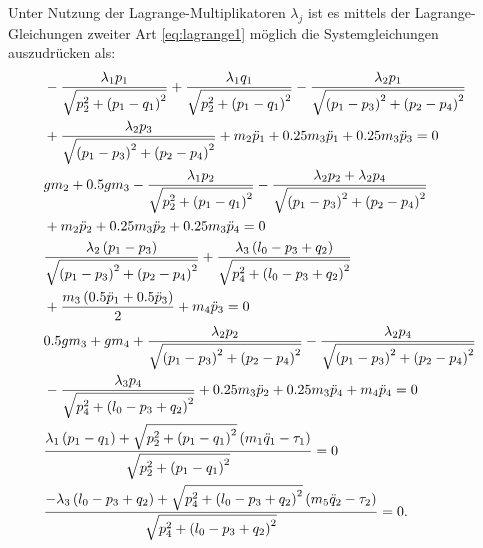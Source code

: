 Unter Nutzung der Lagrange-Multiplikatoren $\lambda_j$ ist es mittels der Lagrange-Gleichungen zweiter Art \eqref{eq:lagrange1} möglich die Systemgleichungen auszudrücken als:
\begin{subequations}
	\begin{flalign}
		&- \frac{\lambda_{1} p_{1}}{\sqrt{p_{2}^{2} + \left(p_{1} - q_{1}\right)^{2}}} + \frac{\lambda_{1} q_{1}}{\sqrt{p_{2}^{2} + \left(p_{1} - q_{1}\right)^{2}}} - \frac{\lambda_{2} p_{1}}{\sqrt{\left(p_{1} - p_{3}\right)^{2} + \left(p_{2} - p_{4}\right)^{2}}} \nonumber \\
		&+ \frac{\lambda_{2} p_{3}}{\sqrt{\left(p_{1} - p_{3}\right)^{2} + \left(p_{2} - p_{4}\right)^{2}}} + m_{2} \ddot{p}_{1} + 0.25 m_{3} \ddot{p}_{1} + 0.25 m_{3} \ddot{p}_{3} = 0\\
		&g m_{2} + 0.5 g m_{3} - \frac{\lambda_{1} p_{2}}{\sqrt{p_{2}^{2} + \left(p_{1} - q_{1}\right)^{2}}} - \frac{\lambda_{2} p_{2} + \lambda_{2} p_{4}}{\sqrt{\left(p_{1} - p_{3}\right)^{2} + \left(p_{2} - p_{4}\right)^{2}}} \nonumber \\
		&+ m_{2} \ddot{p}_{2} + 0.25 m_{3} \ddot{p}_{2} + 0.25 m_{3} \ddot{p}_{4} = 0\\
		&\frac{\lambda_{2} \left(p_{1} - p_{3}\right)}{\sqrt{\left(p_{1} - p_{3}\right)^{2} + \left(p_{2} - p_{4}\right)^{2}}} + \frac{\lambda_{3} \left(l_{0} - p_{3} + q_{2}\right)}{\sqrt{p_{4}^{2} + \left(l_{0} - p_{3} + q_{2}\right)^{2}}} \noindent \\
		&+ \frac{m_{3} \left(0.5 \ddot{p}_{1} + 0.5 \ddot{p}_{3}\right)}{2} + m_{4} \ddot{p}_{3} = 0\\
		&0.5 g m_{3} + g m_{4} + \frac{\lambda_{2} p_{2}}{\sqrt{\left(p_{1} - p_{3}\right)^{2} + \left(p_{2} - p_{4}\right)^{2}}} - \frac{\lambda_{2} p_{4}}{\sqrt{\left(p_{1} - p_{3}\right)^{2} + \left(p_{2} - p_{4}\right)^{2}}} \nonumber \\ 
		&- \frac{\lambda_{3} p_{4}}{\sqrt{p_{4}^{2} + \left(l_{0} - p_{3} + q_{2}\right)^{2}}} + 0.25 m_{3} \ddot{p}_{2} + 0.25 m_{3} \ddot{p}_{4} + m_{4} \ddot{p}_{4} = 0\\
		&\frac{\lambda_{1} \left(p_{1} - q_{1}\right) + \sqrt{p_{2}^{2} + \left(p_{1} - q_{1}\right)^{2}} \left(m_{1} \ddot{q}_{1} - \tau_{1}\right)}{\sqrt{p_{2}^{2} + \left(p_{1} - q_{1}\right)^{2}}} = 0\\
		&\frac{- \lambda_{3} \left(l_{0} - p_{3} + q_{2}\right) + \sqrt{p_{4}^{2} + \left(l_{0} - p_{3} + q_{2}\right)^{2}} \left(m_{5} \ddot{q}_{2} - \tau_{2}\right)}{\sqrt{p_{4}^{2} + \left(l_{0} - p_{3} + q_{2}\right)^{2}}} = 0.
	\end{flalign}
\end{subequations}

